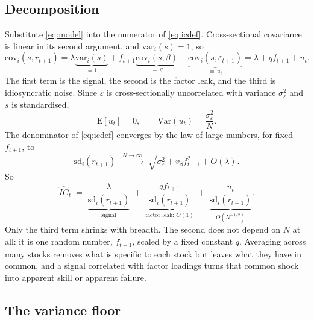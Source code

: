 \documentclass[11pt,a4paper]{article}
\newcommand{\ICh}{\widehat{IC}}
\begin{document}
\subsection{Decomposition}

Substitute \eqref{eq:model} into the numerator of \eqref{eq:icdef}. Cross-sectional
covariance is linear in its second argument, and $\mathrm{var}_i(s) = 1$, so
\begin{equation}
\mathrm{cov}_i(s, r_{t+1})
= \lambda\underbrace{\mathrm{var}_i(s)}_{=1}
+ f_{t+1}\underbrace{\mathrm{cov}_i(s,\beta)}_{=\,q}
+ \underbrace{\mathrm{cov}_i(s,\varepsilon_{t+1})}_{\equiv\, u_t}
= \lambda + q f_{t+1} + u_t .
\label{eq:numerator}
\end{equation}
The first term is the signal, the second is the factor leak, and the third is
idiosyncratic noise. Since $\varepsilon$ is cross-sectionally uncorrelated with variance
$\sigma_\varepsilon^2$ and $s$ is standardised,
\begin{equation}
\mathrm{E}[u_t] = 0, \qquad \mathrm{Var}(u_t) = \frac{\sigma_\varepsilon^2}{N}.
\label{eq:uvar}
\end{equation}
The denominator of \eqref{eq:icdef} converges by the law of large numbers, for fixed
$f_{t+1}$, to
\begin{equation}
\mathrm{sd}_i(r_{t+1}) \;\xrightarrow{\;N\to\infty\;}\; \sqrt{\sigma_\varepsilon^2 + v_\beta f_{t+1}^2 + O(\lambda)}.
\label{eq:denominator}
\end{equation}
So
\begin{equation}
\ICh_t \;=\;
\underbrace{\frac{\lambda}{\mathrm{sd}_i(r_{t+1})}}_{\text{signal}}
\;+\;\underbrace{\frac{q f_{t+1}}{\mathrm{sd}_i(r_{t+1})}}_{\text{factor leak: } O(1)}
\;+\;\underbrace{\frac{u_t}{\mathrm{sd}_i(r_{t+1})}}_{O(N^{-1/2})}.
\label{eq:decomposition}
\end{equation}
Only the third term shrinks with breadth. The second does not depend on $N$ at all: it
is one random number, $f_{t+1}$, scaled by a fixed constant $q$. Averaging across many stocks removes what is specific to each stock
but leaves what they have in common, and a signal correlated with factor loadings turns
that common shock into apparent skill or apparent failure.

\subsection{The variance floor}
\end{document}
